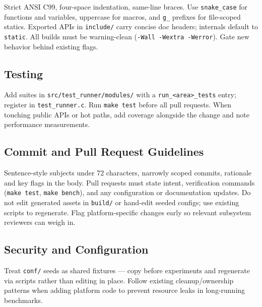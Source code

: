 Strict ANSI C99, four-space indentation, same-line braces. Use
\texttt{snake\_case} for functions and variables, uppercase for macros, and
\texttt{g\_} prefixes for file-scoped statics. Exported APIs in
\texttt{include/} carry concise doc headers; internals default to
\texttt{static}. All builds must be warning-clean (\texttt{-Wall -Wextra
-Werror}). Gate new behavior behind existing flags.

\subsection{Testing}

Add suites in \texttt{src/test\_runner/modules/} with a
\texttt{run\_<area>\_tests} entry; register in \texttt{test\_runner.c}. Run
\texttt{make test} before all pull requests. When touching public APIs or hot
paths, add coverage alongside the change and note performance measurements.

\subsection{Commit and Pull Request Guidelines}

Sentence-style subjects under 72 characters, narrowly scoped commits,
rationale and key flags in the body. Pull requests must state intent,
verification commands (\texttt{make test}, \texttt{make bench}), and any
configuration or documentation updates. Do not edit generated assets in
\texttt{build/} or hand-edit seeded configs; use existing scripts to
regenerate. Flag platform-specific changes early so relevant subsystem
reviewers can weigh in.

\subsection{Security and Configuration}

Treat \texttt{conf/} seeds as shared fixtures — copy before experiments and
regenerate via scripts rather than editing in place. Follow existing
cleanup/ownership patterns when adding platform code to prevent resource
leaks in long-running benchmarks.
